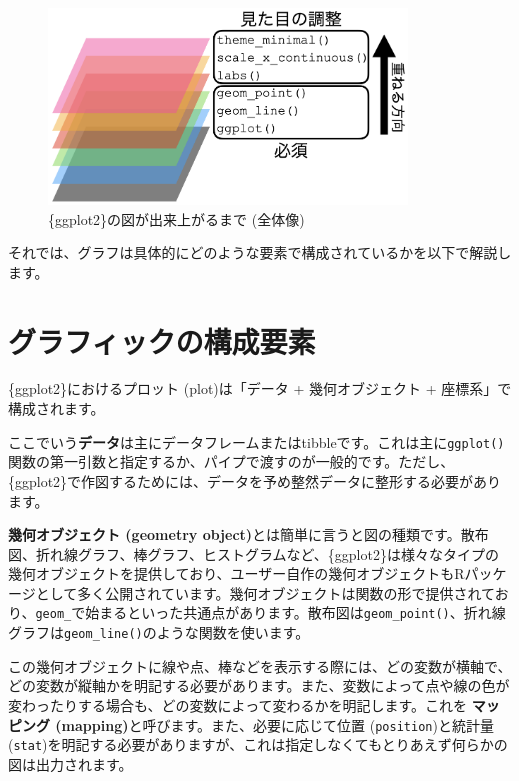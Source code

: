 \documentclass[
  a4paper,
  pandoc,
  ja=standard,
  jafont=haranoaji]{bxjsbook}
\begin{document}
\begin{figure}

{\centering \includegraphics[width=0.85\textwidth,height=\textheight]{./Figs/Visualization1/Layer_Example.png}

}

\caption{\label{fig-visual1_layer_example}\{ggplot2\}の図が出来上がるまで
(全体像)}

\end{figure}

それでは、グラフは具体的にどのような要素で構成されているかを以下で解説します。

\hypertarget{sec-visual1_structure}{%
\section{グラフィックの構成要素}\label{sec-visual1_structure}}

\{ggplot2\}におけるプロット (plot)は「データ + 幾何オブジェクト +
座標系」で構成されます。

ここでいう\textbf{データ}は主にデータフレームまたはtibbleです。これは主に\texttt{ggplot()}関数の第一引数と指定するか、パイプで渡すのが一般的です。ただし、\{ggplot2\}で作図するためには、データを予め整然データに整形する必要があります。

\textbf{幾何オブジェクト (geometry
object)}とは簡単に言うと図の種類です。散布図、折れ線グラフ、棒グラフ、ヒストグラムなど、\{ggplot2\}は様々なタイプの幾何オブジェクトを提供しており、ユーザー自作の幾何オブジェクトもRパッケージとして多く公開されています。幾何オブジェクトは関数の形で提供されており、\texttt{geom\_}で始まるといった共通点があります。散布図は\texttt{geom\_point()}、折れ線グラフは\texttt{geom\_line()}のような関数を使います。

この幾何オブジェクトに線や点、棒などを表示する際には、どの変数が横軸で、どの変数が縦軸かを明記する必要があります。また、変数によって点や線の色が変わったりする場合も、どの変数によって変わるかを明記します。これを
\textbf{マッピング (mapping)}と呼びます。また、必要に応じて位置
(\texttt{position})と統計量
(\texttt{stat})を明記する必要がありますが、これは指定しなくてもとりあえず何らかの図は出力されます。
\end{document}
